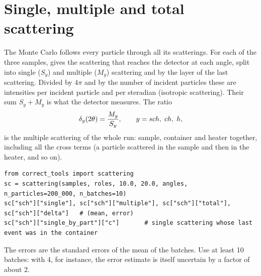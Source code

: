 \section{Single, multiple and total scattering}
\label{sec:correct-ms}

The Monte Carlo follows every particle through all its scatterings. For each of the three samples,
 gives the scattering that reaches the detector at each angle, split into single ($S_y$) and
multiple ($M_y$) scattering and by the layer of the last scattering. Divided by $4\pi$ and by the number of incident particles these
are intensities per incident particle and per steradian (isotropic scattering). Their sum $S_y+M_y$ is what the detector measures.
The ratio
\begin{equation}
  \delta_y(2\theta) = \frac{M_y}{S_y}, \qquad y = sch,\; ch,\; h,
\end{equation}
is the multiple scattering of the whole run: sample, container and heater together, including all the cross terms (a particle
scattered in the sample and then in the heater, and so on).
\begin{lstlisting}
from correct_tools import scattering
sc = scattering(samples, roles, 10.0, 20.0, angles, n_particles=200_000, n_batches=10)
sc["sch"]["single"], sc["sch"]["multiple"], sc["sch"]["total"], sc["sch"]["delta"]   # (mean, error)
sc["sch"]["single_by_part"]["c"]       # single scattering whose last event was in the container
\end{lstlisting}
The errors are the standard errors of the mean of the batches. Use at least 10 batches: with 4, for instance, the error estimate is
itself uncertain by a factor of about 2.

